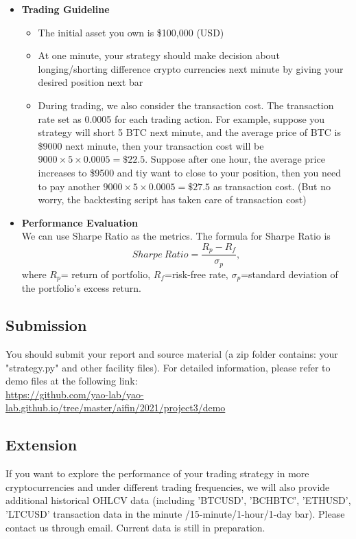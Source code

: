 \documentclass[11pt]{article}
\begin{document}
\begin{itemize}
    \item \textbf{Trading Guideline}
    \begin{itemize}
        \item The initial asset you own is \$100,000 (USD)
        \item At one minute, your strategy should make decision about longing/shorting difference crypto currencies next minute by giving your desired position next bar
        \item During trading, we also consider the transaction cost. The transaction rate set as 0.0005 for each trading action. For example, suppose you strategy will short 5 BTC next minute, and the average price of BTC is \$9000 next minute, then your transaction cost will be $9000\times5\times0.0005=\$22.5$. Suppose after one hour, the average price increases to \$9500 and tiy want to close to your position, then you need to pay another $9000\times5\times0.0005=\$27.5$ as transaction cost. (But no worry, the backtesting script has taken care of transaction cost)
    \end{itemize}
    \item \textbf{Performance Evaluation} \\
    
    We can use Sharpe Ratio as the metrics. The formula for Sharpe Ratio is 
    $$Sharpe\ Ratio = \frac{R_p-R_f}{\sigma_p},$$ 
    where $R_p$= return of portfolio, $R_f$=risk-free rate, $\sigma_p$=standard deviation of the portfolio's excess return.
\end{itemize}

\subsection{Submission}
You should submit your report and source material (a zip folder contains: your "strategy.py" and other facility files). For detailed information, please refer to demo files at the following link:\\
\url{https://github.com/yao-lab/yao-lab.github.io/tree/master/aifin/2021/project3/demo} 

\subsection{Extension}
If you want to explore the performance of your trading strategy in more cryptocurrencies and under different trading frequencies, we will also provide additional historical OHLCV data (including 'BTCUSD', 'BCHBTC', 'ETHUSD', 'LTCUSD' transaction data in the minute /15-minute/1-hour/1-day bar). Please contact us through email. Current data is still in preparation.
\end{document}
